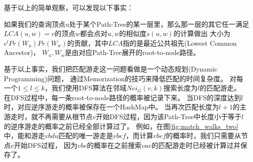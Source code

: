 \documentclass[master]{njuthesis}
\begin{document}
基于以上的简单观察，可以发现以下事实：
\begin{fact}
如果我们的查询顶点$u$处于某个Path-Tree的某一层里，那么那一层的其它任一满足$LCA(u, w)=v$的顶点$w$都会点对$u,w$的相似度$s(u,w)$的计算做出
大小为$c^{l}Pr(W_u)Pr(W_w)$的贡献，其中$LCA$指的是最近公共祖先(Lowest Common Ancestor)，
$W_u, W_w$是由对应Path-Tree展开的root-to-node路径。
\end{fact}
基于以上事实，我们把匹配游走这一问题看做是一个动态规划(Dynamic Programming)问题，
通过Memorization的技巧来降低匹配的时间复杂度。
对每一个$1 \leq l \leq k$，我们使用DFS算法在邻域$Nei_G(v,k)$搜索长度为$l$的匹配游走。
在DFS过程中，每一条root-to-node路径的概率被记录下来。
当DFS的深度达到$l$时，对应逆序游走的概率被保存在一个HashMap中。
当再次匹配长度为$l+1$的主游走时，就不再需要从根节点$v$开始DFS过程，因为该Path-Tree中长度小于等于$l$的逆序游走的概率之前已经全部计算过了。
例如，在图\ref{fig:match_walks_two}中，能和游走$vbdu$匹配的唯一游走是$vbef$，而计算$vbef$的概率时，我们只需要从节点$e$开始DFS过程，
因为$vbe$的概率在之前搜索$vae$的匹配游走时已经被计算过并保存了。
\end{document}
